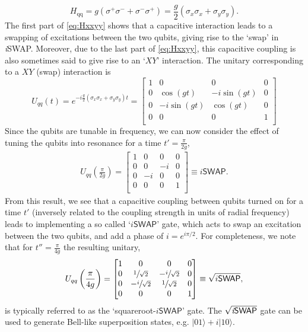 \documentclass[aip,apr,twocolumn,showpacs,superscriptaddress,groupedaddress,nofootinbib,reprint]{revtex4-1}  %
\newcommand{\iSWAP}{\emph{i}\textsf{SWAP}}
\begin{document}
\begin{equation}
H_\text{qq} = g\left( \sigma^+\sigma^- + \sigma^-\sigma^+\right) = \frac{g}{2}\left(\sigma_x\sigma_x + \sigma_y\sigma_y \right). \label{eq:Hxxyy}
\end{equation}
The first part of \cref{eq:Hxxyy} shows that a capacitive interaction leads to a swapping of excitations between the two qubits, giving rise to the `swap' in \iSWAP{}. Moreover, due to the last part of \cref{eq:Hxxyy}, this capacitive coupling is also sometimes said to give rise to an `$XY$' interaction\cite{Schuch2003}. The unitary corresponding to a $XY$ (swap) interaction is
\begin{equation}
U_{qq}(t) = e^{-i\frac{g}{2}\left(\sigma_x\sigma_x + \sigma_y\sigma_y \right)t}=
\begin{bmatrix}
1 & 0 & 0 & 0 \\
0 & \cos(gt) & -i\sin(gt) & 0\\
0 & -i\sin(gt) & \cos(gt) & 0\\
0 & 0 & 0 & 1 \\
\end{bmatrix} \label{eq:Uqq}
\end{equation}
Since the qubits are tunable in frequency, we can now consider the effect of tuning the qubits into resonance for a time $t' = \frac{\pi}{2g}$,
\begin{align}
U_{qq}\left(\frac{\pi}{2g}\right) = \begin{bmatrix}
1 & 0 & 0 & 0 \\
0 & 0 & -i & 0\\
0 & -i & 0 & 0\\
0 & 0 & 0 & 1 \\
\end{bmatrix} \equiv i\textsf{SWAP}.
\end{align}
From this result, we see that a capacitive coupling between qubits turned on for a time $t'$ (inversely related to the coupling strength in units of radial frequency) leads to implementing a so called `$i\textsf{SWAP}$' gate\cite{Wendin2007,Steffen2006,Majer2007,Bialczak2010,Neeley2010,Dewes2012}, which acts to swap an excitation between the two qubits, and add a phase of $i = e^{i\pi/2}$. For completeness, we note that for $t'' = \frac{\pi}{4g}$ the resulting unitary,
\begin{align}
U_{qq}\left(\frac{\pi}{4g}\right) = \begin{bmatrix}
1 & 0 & 0 & 0 \\
0 & \sfrac{1}{\sqrt{2}} & -\sfrac{i}{\sqrt{2}} & 0\\
0 & -\sfrac{i}{\sqrt{2}} & \sfrac{1}{\sqrt{2}} & 0\\
0 & 0 & 0 & 1 \\
\end{bmatrix} \equiv \sqrt{i\textsf{SWAP}},
\end{align}
is typically referred to as the `squareroot-$i\textsf{SWAP}$' gate. The $\sqrt{\iSWAP{}}$ gate can be used to generate Bell-like superposition states, e.g. $|01\rangle + i |10\rangle$.
\end{document}
